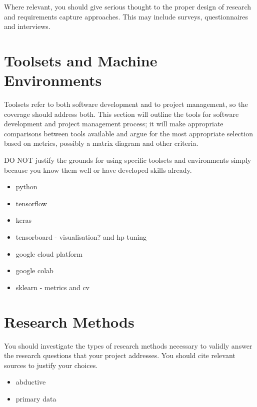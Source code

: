 Where relevant, you should give serious thought to the proper design of research and requirements capture approaches. This may include surveys, questionnaires and interviews. 

\section{Toolsets and Machine Environments}
Toolsets refer to both software development and to project management, so the coverage should address both. This section will outline the tools for software development and project management process; it will make appropriate comparisons between tools available and argue for the most appropriate selection based on metrics, possibly a matrix diagram and other criteria.

DO NOT justify the grounds for using specific toolsets and environments simply because you know them well or have developed skills already. 

\begin{itemize}
    \item python
    \item tensorflow
    \item keras
    \item tensorboard - visualisation? and hp tuning
    \item google cloud platform
    \item google colab
    \item sklearn - metrics and cv
\end{itemize}

\section{Research Methods}
You should investigate the types of research methods necessary to validly answer the research questions that your project addresses. You should cite relevant sources to justify your choices.
\begin{itemize}
    \item abductive
    \item primary data
    
\end{itemize}
